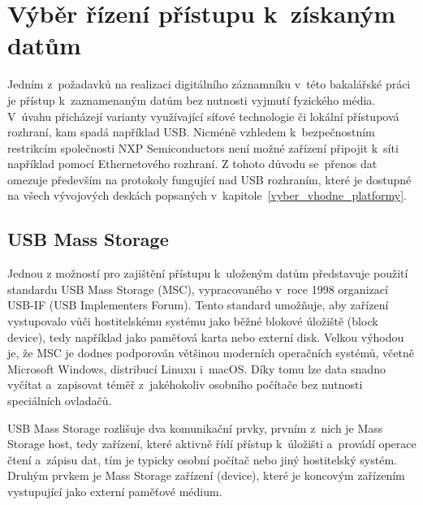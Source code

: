 
\section{Výběr řízení přístupu k~získaným datům}
\label{vyber_rizeni_pristupu_k_ziskanym_datum}
Jedním z~požadavků na realizaci digitálního záznamníku v~této bakalářské práci je přístup k~zaznamenaným datům bez nutnosti vyjmutí fyzického média. V~úvahu přicházejí varianty využívající síťové technologie či lokální přístupová rozhraní, kam spadá například USB. Nicméně vzhledem k~bezpečnostním restrikcím společnosti NXP Semiconductors není možné zařízení připojit k~síti například pomocí Ethernetového rozhraní. Z tohoto důvodu se~přenos dat omezuje především na protokoly fungující nad USB rozhraním, které je dostupné na všech vývojových deskách popsaných v~kapitole~\ref{vyber_vhodne_platformy}.

\newpage
\subsection{USB Mass Storage}
\label{usb_mass_storage}
Jednou z možností pro zajištění přístupu k~uloženým datům představuje použití standardu USB Mass Storage (MSC), vypracovaného v~roce 1998 organizací USB-IF (USB Implementers Forum). Tento standard umožňuje, aby zařízení vystupovalo vůči hostitelskému systému jako běžné blokové úložiště (block device), tedy například jako paměťová karta nebo externí disk. Velkou výhodou je, že MSC je dodnes podporován většinou moderních operačních systémů, včetně Microsoft Windows, distribucí Linuxu i~macOS. Díky tomu lze data snadno vyčítat a~zapisovat téměř z~jakéhokoliv osobního počítače bez nutnosti speciálních ovladačů.~\cite{usb_standard_ufi, silicon_labs_mass_storage_protocol}

USB Mass Storage rozlišuje dva komunikační prvky, prvním z~nich je Mass Storage host, tedy zařízení, které aktivně řídí přístup k~úložišti a~provádí operace čtení a~zápisu dat, tím je typicky osobní počítač nebo jiný hostitelský systém. Druhým prvkem je Mass Storage zařízení (device), které je koncovým zařízením vystupující jako externí paměťové médium.~\cite{usb_standard_ufi, silicon_labs_mass_storage_protocol}

